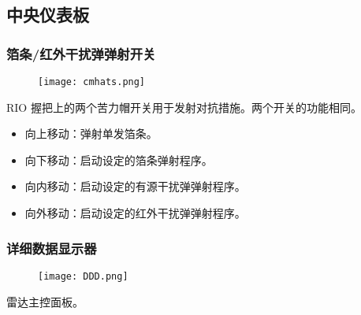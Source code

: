 \subsection{中央仪表板}

\subsubsection{箔条/红外干扰弹弹射开关}
\begin{figure}[htb]
	\centering
	\texttt{[image: cmhats.png]}
\end{figure}
RIO 握把上的两个苦力帽开关用于发射对抗措施。两个开关的功能相同。

\begin{itemize}
	\item 向上移动：弹射单发箔条。
	\item 向下移动：启动设定的箔条弹射程序。
	\item 向内移动：启动设定的有源干扰弹弹射程序。
	\item 向外移动：启动设定的红外干扰弹弹射程序。
\end{itemize}

\subsubsection{详细数据显示器}
\begin{figure}[htb]
	\centering
	\texttt{[image: DDD.png]}
\end{figure}
雷达主控面板。


